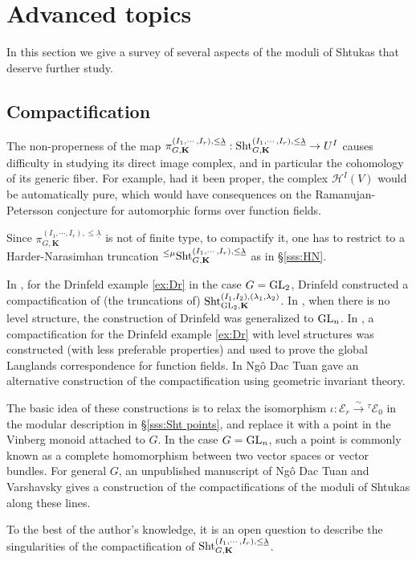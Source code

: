 \documentclass[11pt]{amsart}
\numberwithin{equation}{section}
\theoremstyle{plain}
\theoremstyle{definition}
\newcommand\cE{\mathcal{E}}
\newcommand\cH{\mathcal{H}}
\def\bK{\mathbf{K}}
\newcommand\Sht{\textup{Sht}}
\newcommand\GL{\textup{GL}}
\newcommand{\isom}{\stackrel{\sim}{\to}}
\newcommand\un{\underline}
\newcommand{\io}{\iota}
\renewcommand{\t}{\tau}
\renewcommand{\l}{\lambda}
\begin{document}
\section{Advanced topics}\label{s:adv}
In this section we give a survey of several aspects of the moduli of Shtukas that deserve further study. 

\subsection{Compactification}
The non-properness of the map $\pi^{(I_{1},\cdots, I_{r}),\le \un\l}_{G,\bK}: \Sht^{(I_{1},\cdots, I_{r}),\le \un\l}_{G,\bK}\to U^{I}$ causes difficulty in studying its direct image complex, and in particular the cohomology of its generic fiber. For example, had it been proper, the complex $\cH^{I}(V)$ would be automatically pure, which would have consequences on the Ramanujan-Petersson conjecture for automorphic forms over function fields. 

Since $\pi^{(I_{1},\cdots, I_{r}),\le \un\l}_{G,\bK}$ is not of finite type, to compactify it, one has to restrict to a Harder-Narasimhan truncation ${}^{\le \mu}\Sht^{(I_{1},\cdots, I_{r}),\le \un\l}_{G,\bK}$ as in \S\ref{sss:HN}.

In \cite{Dr-comp}, for the Drinfeld example \ref{ex:Dr} in  the case $G=\GL_{2}$, Drinfeld constructed a compactification of (the truncations of) $\Sht^{(I_{1},I_{2}),(\l_{1},\l_{2})}_{\GL_{2}, \bK}$. In \cite{Laff-comp}, when there is no level structure,  the construction of Drinfeld was generalized to $\GL_{n}$. In \cite{LLaff}, a compactification for the Drinfeld example \ref{ex:Dr} with level structures was constructed (with less preferable properties) and used to prove the global Langlands correspondence for function fields. In \cite{NDT} Ng\^o Dac Tuan gave an alternative construction of the compactification using geometric invariant theory. 

The basic idea of these constructions is to relax the isomorphism $\io: \cE_{r}\isom {}^{\t}\cE_{0}$ in the modular description in \S\ref{sss:Sht points}, and replace it with a point in the Vinberg monoid attached to $G$. In the case $G=\GL_{n}$, such a point is commonly known as a complete homomorphism between two vector spaces or vector bundles. For general $G$, an unpublished manuscript of Ng\^o Dac Tuan and Varshavsky gives a construction of the compactifications of the moduli of Shtukas along these lines. 

To the best of the author's knowledge, it is an open question to describe the singularities of the compactification of $\Sht^{(I_{1},\cdots, I_{r}),\le\un\l}_{G,\bK}$.
\end{document}
